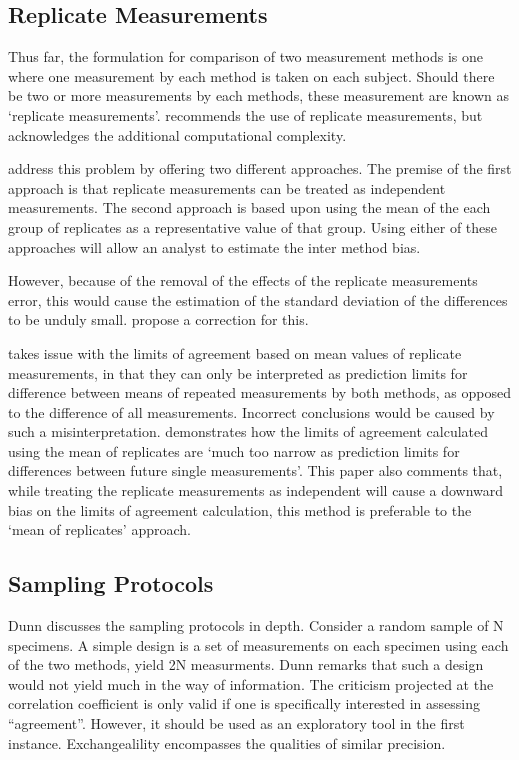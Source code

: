 \documentclass[12pt, a4paper]{report}
\theoremstyle{plain}
\theoremstyle{definition}
\theoremstyle{remark}
\begin{document}
	
	
	
	
	
	\subsection{Replicate Measurements}
	
	Thus far, the formulation for comparison of two measurement methods is one where one measurement by each method is taken on	each subject. Should there be two or more measurements by each methods, these measurement are known as `replicate measurements'.
	\citet{BXC2008} recommends the use of replicate measurements, but acknowledges the additional computational complexity.
	
	\citet*{BA86} address this problem by offering two different approaches. The premise of the first approach is that replicate
	measurements can be treated as independent measurements. The second approach is based upon using the mean of the each group of
	replicates as a representative value of that group. Using either
	of these approaches will allow an analyst to estimate the inter
	method bias.
	
	
	However, because of the removal of the effects of the replicate
	measurements error, this would cause the estimation of the
	standard deviation of the differences to be unduly small.
	\citet*{BA86} propose a correction for this.
	
	\citet{BXC2008} takes issue with the limits of agreement based on
	mean values of replicate measurements, in that they can only be interpreted as prediction
	limits for difference between means of repeated measurements by
	both methods, as opposed to the difference of all measurements.
	Incorrect conclusions would be caused by such a misinterpretation.
	\citet{BXC2008} demonstrates how the limits of agreement
	calculated using the mean of replicates are `much too narrow as
	prediction limits for differences between future single
	measurements'. This paper also comments that, while treating the
	replicate measurements as independent will cause a downward bias
	on the limits of agreement calculation, this method is preferable
	to the `mean of replicates' approach.
	
	

\subsection{Sampling Protocols}
Dunn discusses the sampling protocols in depth. Consider a random sample of N specimens. A simple design is a  set of measurements on each specimen using each of the two methods, yield 2N measurments. Dunn remarks that such a design would not yield much in the way of information.
The criticism projected at the correlation coefficient is only valid if one is specifically interested in assessing “agreement”. However, it should be used as an exploratory tool in the first instance.
Exchangealility encompasses the qualities of similar precision.
\end{document}
